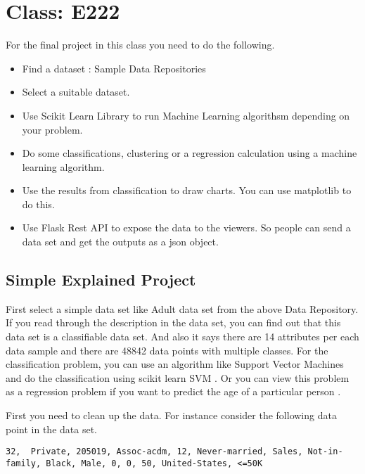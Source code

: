 \section{Class: E222}\label{s:classe22-proj}

For the final project in this class you need to do the following.

\begin{itemize}
\item Find a dataset : Sample Data Repositories 
\item Select a suitable dataset.
\item Use Scikit Learn Library to run Machine Learning algorithsm depending on your problem.
\item Do some classifications, clustering or a regression calculation using a machine learning algorithm.
\item Use the results from classification to draw charts. You can use matplotlib to do this.
\item Use Flask Rest API to expose the data to the viewers. So people can send a data set and get the outputs as a json object.   
\end{itemize}


\subsection{Simple Explained Project}\label{s:e222-proj-exp}

First select a simple data set like Adult data set from the above Data
Repository. If you read through the description in the data set, you
can find out that this data set is a classifiable data set. And also
it says there are 14 attributes per each data sample and there are
48842 data points with multiple classes. For the classification
problem, you can use an algorithm like Support Vector Machines and do
the classification using scikit learn SVM
. Or you can view
this problem as a regression problem if you want to predict the age of
a particular person
.

First you need to clean up the data. For instance consider the following data point in the data set. 

\begin{lstlisting}
32,  Private, 205019, Assoc-acdm, 12, Never-married, Sales, Not-in-family, Black, Male, 0, 0, 50, United-States, <=50K
\end{lstlisting}

